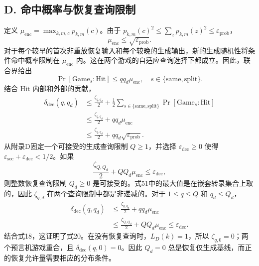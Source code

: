 \documentclass[UTF8,a4paper,zihao=-4,fontset=windows,openany]{ctexbook}
\begin{document}
\subsection*{D. 命中概率与恢复查询限制}

定义 \(\mu_{\mathrm{enc}} = \max_{k,m,c} p_{k,m}(c)\)。由于 \(p_{k,m}(c)^2 \le \sum_z p_{k,m}(z)^2 \le \varepsilon_{\mathrm{prob}}\)，
\begin{equation}
\mu_{\mathrm{enc}} \le \sqrt{\varepsilon_{\mathrm{prob}}}. \tag{52}
\end{equation}
对于每个较早的首次非重放恢复输入和每个较晚的生成输出，新的生成随机性将条件命中概率限制在 \(\mu_{\mathrm{enc}}\) 内。这在两个游戏的自适应查询选择下都成立。因此，联合界给出
\begin{equation}
\Pr[\mathrm{Game}_s : \mathrm{Hit}] \le q q_d \mu_{\mathrm{enc}}, \quad s \in \{\mathrm{same}, \mathrm{split}\}. \tag{53}
\end{equation}
结合 \(\mathrm{Hit}\) 内部和外部的贡献，
\begin{equation}
\begin{aligned}
\delta_{\mathrm{dec}}(q, q_d) &\le \frac{\zeta_{q, q_d}}{2} + \frac{1}{2} \sum_{s \in \{\mathrm{same}, \mathrm{split}\}} \Pr[\mathrm{Game}_s : \mathrm{Hit}] \\
&\le \frac{\zeta_{q, q_d}}{2} + q q_d \mu_{\mathrm{enc}} \\
&\le \frac{\zeta_{q, q_d}}{2} + q q_d \sqrt{\varepsilon_{\mathrm{prob}}}.
\end{aligned} \tag{54}
\end{equation}
从附录D固定一个可接受的生成查询限制 \(Q \ge 1\)，并选择 \(\varepsilon_{\mathrm{dec}} \ge 0\) 使得 \(\varepsilon_{\mathrm{sec}} + \varepsilon_{\mathrm{dec}} < 1/2\)。如果
\begin{equation}
\frac{\zeta_{Q, Q_d}}{2} + Q Q_d \mu_{\mathrm{enc}} \le \varepsilon_{\mathrm{dec}}, \tag{55}
\end{equation}
则整数恢复查询限制 \(Q_d \ge 0\) 是可接受的。式51中的最大值是在嵌套转录集合上取的，因此 \(\zeta_{q,d}\) 在两个查询限制中都是非递减的。对于 \(1 \le q \le Q\) 和 \(q_d \le Q_d\)，
\begin{equation}
\begin{aligned}
\delta_{\mathrm{dec}}(q, q_d) &\le \frac{\zeta_{q, q_d}}{2} + q q_d \mu_{\mathrm{enc}} \\
&\le \frac{\zeta_{Q, Q_d}}{2} + Q Q_d \mu_{\mathrm{enc}} \le \varepsilon_{\mathrm{dec}}.
\end{aligned} \tag{56}
\end{equation}
结合式18，这证明了式20。在没有恢复查询时，\(L_D(k) = 1\)，所以 \(\zeta_{q,0} = 0\)；两个预言机游戏重合，且 \(\delta_{\mathrm{dec}}(q, 0) = 0\)。因此 \(Q_d = 0\) 总是恢复仅生成基线，而正的恢复允许量需要相应的分布条件。
\end{document}
